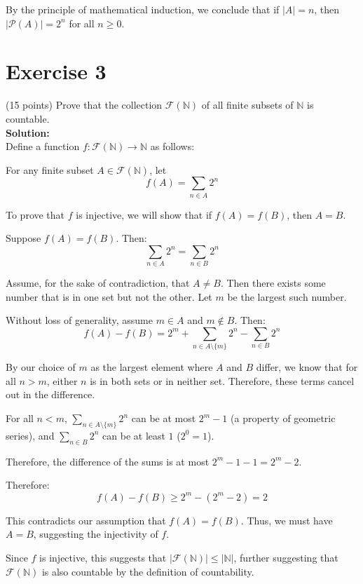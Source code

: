 \documentclass{article}
\begin{document}
By the principle of mathematical induction, we conclude that if $|A| = n$, then $|\mathcal{P}(A)| = 2^n$ for all $n \geq 0$.

\newpage

\section*{Exercise 3}
(15 points) Prove that the collection $\mathcal{F}(\mathbb{N})$ of all finite subsets of $\mathbb{N}$ is countable. \\

\textbf{Solution:} \\

Define a function $f: \mathcal{F}(\mathbb{N}) \rightarrow \mathbb{N}$ as follows:

For any finite subset $A \in \mathcal{F}(\mathbb{N})$, let
\[f(A) = \sum_{n \in A} 2^n\]

To prove that $f$ is injective, we will show that if $f(A) = f(B)$, then $A = B$. 

Suppose $f(A) = f(B)$. Then:
\[\sum_{n \in A} 2^n = \sum_{n \in B} 2^n\]

Assume, for the sake of contradiction, that $A \neq B$. Then there exists some number that is in one set but not the other. Let $m$ be the largest such number.

Without loss of generality, assume $m \in A$ and $m \notin B$. Then:
\[f(A) - f(B) = 2^m + \sum_{n \in A \setminus \{m\}} 2^n - \sum_{n \in B} 2^n\]

By our choice of $m$ as the largest element where $A$ and $B$ differ, we know that for all $n > m$, either $n$ is in both sets or in neither set. Therefore, these terms cancel out in the difference.

For all $n < m$, $\sum_{n \in A \setminus \{m\}} 2^n$ can be at most $2^m - 1$ (a property of geometric series), and $\sum_{n \in B} 2^n$ can be at least $1$ ($2^0 = 1$).

Therefore, the difference of the sums is at most $2^m - 1 - 1 = 2^m - 2$.

Therefore:
\[f(A) - f(B) \geq 2^m - (2^m - 2) = 2\]

This contradicts our assumption that $f(A) = f(B)$. Thus, we must have $A = B$, suggesting the injectivity of $f$.

Since $f$ is injective, this suggests that $|\mathcal{F}(\mathbb{N})| \leq |\mathbb{N}|$, further suggesting that $\mathcal{F}(\mathbb{N})$ is also countable by the definition of countability.
\end{document}
